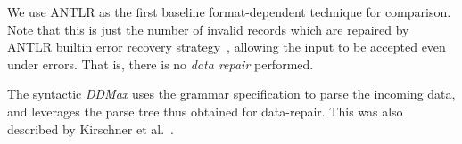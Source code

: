 \documentclass[acmsmall,screen,review,anonymous]{acmart}
\newcommand{\formatdependent}{format-dependent\xspace}
\newcommand{\dtask}{data repair\xspace}
\newcommand{\ddmax}{\textit{DDMax}\xspace}
\begin{document}
\begin{description}[wide]
\item[\textbf{(3) ANTLR:}] We use ANTLR as the first baseline \formatdependent
  technique for comparison. Note that this is just the number of invalid records
  which are repaired by ANTLR builtin error recovery strategy~\cite{parr2013definitive},
  allowing the input to be accepted even under errors. That is, there is no
  \emph{\dtask} performed.

\item[\textbf{(4) Syntactic \ddmax:}] The syntactic \ddmax uses the
  grammar specification to parse the incoming data, and leverages the parse
  tree thus obtained for data-repair.
  This was also described by Kirschner et al.~\cite{kirschner2020debugging}.
\end{description}
%
\end{document}
